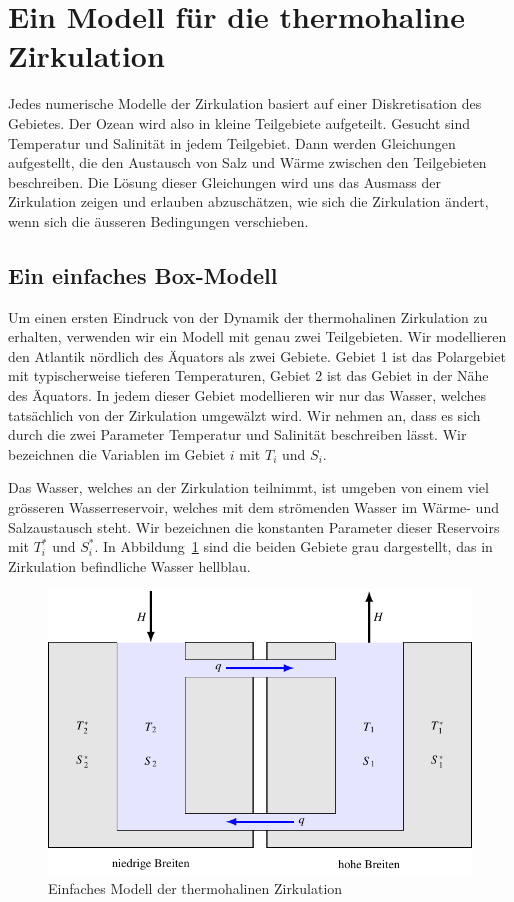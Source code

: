 %
%
%
\section{Ein Modell für die thermohaline Zirkulation}
Jedes numerische Modelle der Zirkulation basiert auf einer Diskretisation
des Gebietes.
Der Ozean wird also in kleine Teilgebiete aufgeteilt.
Gesucht sind Temperatur und Salinität in jedem Teilgebiet.
Dann werden Gleichungen aufgestellt, die den Austausch von Salz und
Wärme zwischen den Teilgebieten beschreiben.
Die Lösung dieser Gleichungen wird uns das Ausmass der Zirkulation zeigen
und erlauben abzuschätzen, wie sich die Zirkulation ändert, wenn sich
die äusseren Bedingungen verschieben.

\subsection{Ein einfaches Box-Modell}
Um einen ersten Eindruck von der Dynamik der thermohalinen Zirkulation
zu erhalten, verwenden wir ein Modell mit genau zwei Teilgebieten.
Wir modellieren den Atlantik nördlich des Äquators als zwei Gebiete.
Gebiet 1 ist das Polargebiet mit typischerweise tieferen Temperaturen,
Gebiet 2 ist das Gebiet in der Nähe des Äquators.
In jedem dieser Gebiet modellieren wir nur das Wasser, welches tatsächlich
von der Zirkulation umgewälzt wird.
Wir nehmen an, dass es sich durch die zwei Parameter Temperatur und
Salinität beschreiben lässt.
Wir bezeichnen die Variablen im Gebiet $i$ mit $T_i$ und $S_i$.

Das Wasser, welches an der Zirkulation teilnimmt, ist umgeben von einem
viel grösseren Wasserreservoir, welches mit dem strömenden Wasser 
im Wärme- und Salzaustausch steht.
Wir bezeichnen die konstanten Parameter dieser Reservoirs mit
$T_i^*$ und $S_i^*$.
In Abbildung~\ref{skript:boxmodell-bild} sind die beiden Gebiete
grau dargestellt, das in Zirkulation befindliche Wasser hellblau.
\begin{figure}
\centering
\includegraphics{chapters/4/boxmodell.pdf}
\caption{Einfaches Modell der thermohalinen Zirkulation
\label{skript:boxmodell-bild}}
\end{figure}

